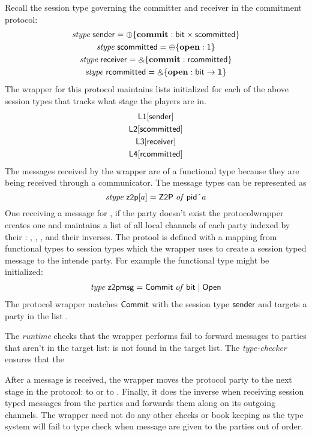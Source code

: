 Recall the session type governing the committer and receiver in the commitment protocol:
\begin{gather}
	\relax{\it stype} \; \mathsf{sender} = \oplus \{ \mathbf{commit} : \mathsf{bit} \times \mathsf{scommitted} \} \\
	\relax{\it stype} \; \mathsf{scommitted} = \oplus \{ \mathbf{open} : 1 \} \\
	\relax{\it stype} \; \mathsf{receiver} = \mathbin{\binampersand} \{ \mathbf{commit} : \mathsf{rcommitted} \} \\
	\relax{\it stype} \; \mathsf{rcommitted} = \mathbin{\binampersand} \{ \mathbf{open} : \mathsf{bit} \rightarrow \mathbf{1} \}
\end{gather}
The wrapper for this protocol maintains lists initialized for each of the above session types that tracks what stage the players are in.
\begin{gather}
	\mathsf{L1}[\mathsf{sender}] \\
	\mathsf{L2}[\mathsf{scommitted}] \\
	\mathsf{L3}[\mathsf{receiver}] \\
	\mathsf{L4}[\mathsf{rcommitted}] 
\end{gather}
The messages received by the wrapper are of a functional type because they are being received through a communicator.
The message types can be represented as
\[
	\relax{\it stype} \; \mathsf{z2p}[a] = \mathsf{Z2P} \; \relax{\it of} \; {\mathsf {pid}} \; \hat{ } \; a
\]
One receiving a message for , if the party doesn't exist the protocolwrapper creates one and maintains a list of all local channels of each party indexed by their : , , , and their inverses.
The protool is defined with a mapping from functional types to session types which the wrapper uses to create a session typed message to the intende party.
For example the functional type might be initialized:
\begin{gather}
\relax{\it type} \; \mathsf{z2pmsg} = \mathsf{Commit} \; \relax{\it of} \; \mathsf{bit} \; | \; \mathsf{Open}
\end{gather}
The protocol wrapper matches $\mathsf{Commit}$ with the session type $\mathsf{sender}$ and targets a party  in the list .

The \textit{runtime} checks that the wrapper performs fail to forward messages to parties that aren't in the target list:  is not found in the target list.
The \textit{type-checker} ensures that the 

After a message is received, the wrapper moves the protocol party to the next stage in the protocol:  to  or  to .
Finally, it does the inverse when receiving session typed messages from the parties and forwards them along on its outgoing channels.
The wrapper need not do any other checks or book keeping as the type system will fail to type check when message are given to the parties out of order. 


